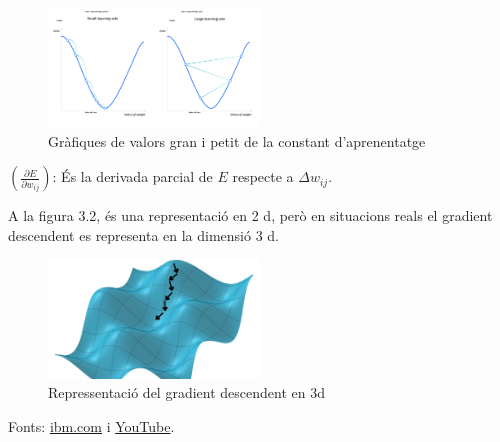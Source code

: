 \begin{figure}[H]
    \centering
    \includegraphics[width=0.5\textwidth]{./figures/constant_gradient.png}
    \caption{Gràfiques de valors gran i petit de la constant d'aprenentatge}
\end{figure}


$\left( \frac{\partial E}{\partial w_{ij}} \right)$: És la derivada parcial de $E$ respecte a $\Delta w_{ij}$.

A la figura 3.2, és una representació en 2 d, però en situacions reals el gradient descendent es representa en la dimensió 3 d.


\begin{figure}[H]
    \centering
    \includegraphics[width=0.5\textwidth]{./figures/gradient_descendent3d.png}
    \caption{Repressentació del gradient descendent en 3d}
\end{figure}

Fonts: \href{https://www.ibm.com/es-es/think/topics/gradient-descent}{ibm.com} i \href{https://www.youtube.com/watch?v=A6FiCDoz8_4&ab_channel=DotCSV}{YouTube}.


